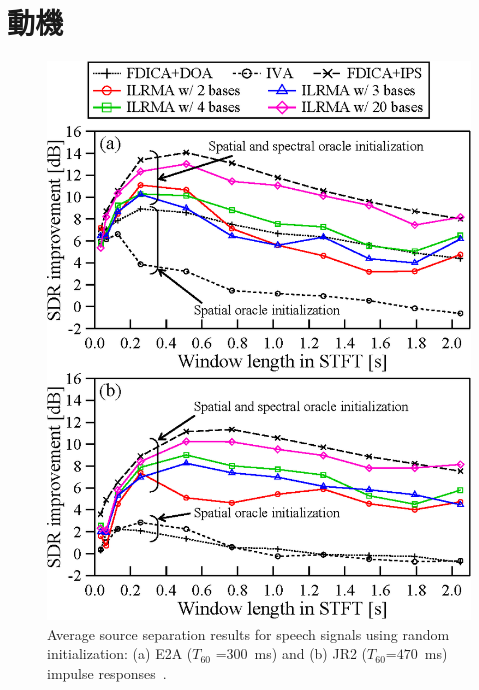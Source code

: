 \section{動機}
\label{sec:moti}
\begin{figure}[t]
    \begin{center}
        \includegraphics[width=0.8\columnwidth]{figures/SpeechE2AJR2_opt12+note.eps}
    \end{center}
    \vspace{-8pt}
	\caption{Average source separation results for speech signals using random initialization: (a) E2A ($T_{60}$ =$300$~ms) and (b) JR2 ($T_{60}$=$470$~ms) impulse responses~\cite{EU}.}
	\label{fig:kitamura_es}
\end{figure}

